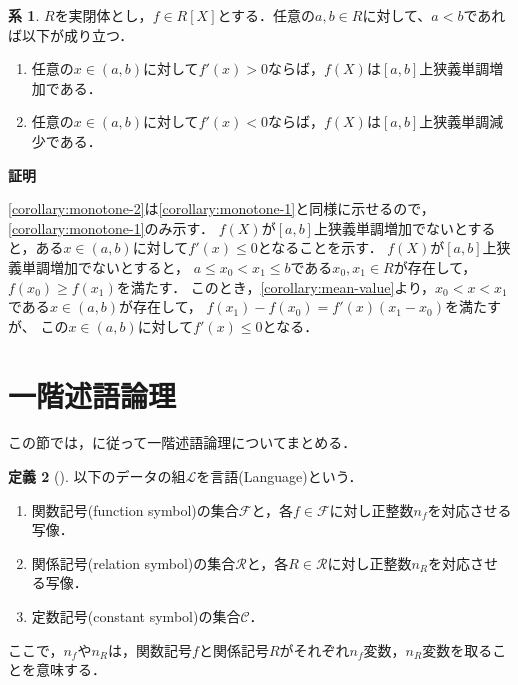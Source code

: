 \documentclass[uplatex, dvipdfmx]{jsarticle}
\makeatletter
\numberwithin{equation}{section}
\renewenvironment{proof}[1][\proofname]{\par
  \pushQED{\qed}%
  \normalfont \topsep6\p@\@plus6\p@\relax
  \trivlist
  \item\relax
  {\bfseries
  #1\@addpunct{.}}\hspace\labelsep\ignorespaces
}{
  \popQED\endtrivlist\@endpefalse
}
\theoremstyle{definition}
\newtheorem{definition}{定義}[section]
\newtheorem{corollary}[definition]{系}
\renewcommand{\proofname}{\textbf{証明}}
\makeatother
\begin{document}
\begin{corollary}\label{corollary:monotone}
     $R$を実閉体とし，$f \in R[X]$とする．任意の$a, b \in R$に対して、$a<b$であれば以下が成り立つ．
     \begin{enumerate}
          \item \label{corollary:monotone-1}
          任意の$x \in (a,b)$に対して$f'(x)>0$ならば，$f(X)$は$[a,b]$上狭義単調増加である．
          \item \label{corollary:monotone-2}
          任意の$x \in (a,b)$に対して$f'(x)<0$ならば，$f(X)$は$[a,b]$上狭義単調減少である．
     \end{enumerate}
\end{corollary}
\begin{proof}
     \ref{corollary:monotone-2}は\ref{corollary:monotone-1}と同様に示せるので，\ref{corollary:monotone-1}のみ示す．
     $f(X)$が$[a,b]$上狭義単調増加でないとすると，ある$x \in (a,b)$に対して$f'(x) \leq 0$となることを示す．
     $f(X)$が$[a,b]$上狭義単調増加でないとすると，
     $a \leq x_0 < x_1 \leq b$である$x_0, x_1 \in R$が存在して，$f(x_0) \geq f(x_1)$を満たす．
     このとき，\cref{corollary:mean-value}より，$x_0 < x < x_1$である$x \in (a,b)$が存在して，
     $f(x_1) - f(x_0) = f'(x)(x_1 - x_0)$を満たすが、
     この$x \in (a,b)$に対して$f'(x) \leq 0$となる．
\end{proof}

\section{一階述語論理}

この節では，\cite{MR1924282}に従って一階述語論理についてまとめる．

\begin{definition}[{\cite[Definition 1.1.1
     ]{MR1924282}}]
     以下のデータの組$\mathcal{L}$を言語(Language)という．
     \begin{enumerate}
          \item 関数記号(function symbol)の集合$\mathcal{F}$と，各$f \in \mathcal{F}$に対し正整数$n_f$を対応させる写像．
          \item 関係記号(relation symbol)の集合$\mathcal{R}$と，各$R \in \mathcal{R}$に対し正整数$n_R$を対応させる写像．
          \item 定数記号(constant symbol)の集合$\mathcal{C}$．
     \end{enumerate}
\end{definition}

ここで，$n_f$や$n_R$は，関数記号$f$と関係記号$R$がそれぞれ$n_f$変数，$n_R$変数を取ることを意味する．
\end{document}
